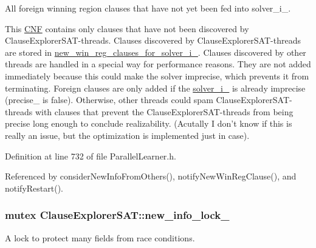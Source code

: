 All foreign winning region clauses that have not yet been fed into solver\-\_\-i\-\_\-. 

This \hyperlink{classCNF}{C\-N\-F} contains only clauses that have not been discovered by Clause\-Explorer\-S\-A\-T-\/threads. Clauses discovered by Clause\-Explorer\-S\-A\-T-\/threads are stored in \hyperlink{classClauseExplorerSAT_a2c3e73b4c0529b9139354a965d34e81f}{new\-\_\-win\-\_\-reg\-\_\-clauses\-\_\-for\-\_\-solver\-\_\-i\-\_\-}. Clauses discovered by other threads are handled in a special way for performance reasons. They are not added immediately because this could make the solver imprecise, which prevents it from terminating. Foreign clauses are only added if the \hyperlink{classClauseExplorerSAT_a65b5b3d04ff5be8bfec60d3dcf86e4d0}{solver\-\_\-i\-\_\-} is already imprecise (precise\-\_\- is false). Otherwise, other threads could spam Clause\-Explorer\-S\-A\-T-\/threads with clauses that prevent the Clause\-Explorer\-S\-A\-T-\/threads from being precise long enough to conclude realizability. (Acutally I don't know if this is really an issue, but the optimization is implemented just in case). 

Definition at line 732 of file Parallel\-Learner.\-h.



Referenced by consider\-New\-Info\-From\-Others(), notify\-New\-Win\-Reg\-Clause(), and notify\-Restart().

\hypertarget{classClauseExplorerSAT_a674651f8fbf9ed93264ce3369bd5332b}{
\subsubsection[{new\-\_\-info\-\_\-lock\-\_\-}]{\setlength{\rightskip}{0pt plus 5cm}mutex Clause\-Explorer\-S\-A\-T\-::new\-\_\-info\-\_\-lock\-\_\-\hspace{0.3cm}{\ttfamily [protected]}}}\label{classClauseExplorerSAT_a674651f8fbf9ed93264ce3369bd5332b}


A lock to protect many fields from race conditions. 

